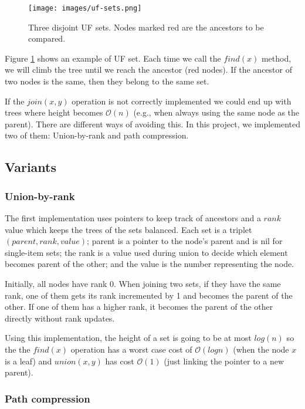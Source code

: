 \documentclass[a4paper,10pt,table,xcdraw]{article}
\begin{document}
\begin{figure}[H]
\centering
\texttt{[image: images/uf-sets.png]}
\caption{ Three disjoint UF sets. Nodes marked red are the ancestors to be compared.}
\label{fig:uf-set}
\end{figure}

Figure \ref{fig:uf-set} shows an example of UF set. Each time we call the $find(x)$ method, we will climb the tree until we reach the ancestor (red nodes). If the ancestor of two nodes is the same, then they belong to the same set. 

If the $join(x,y)$ operation is not correctly implemented we could end up with trees where height becomes $\mathcal{O} (n)$ (e.g., when always using the same node as the parent). There are different ways of avoiding this. In this project, we implemented two of them: Union-by-rank and path compression.


\subsection{Variants}

\subsubsection{Union-by-rank}

The first implementation uses pointers to keep track of ancestors and a $rank$ value which keeps the trees of the sets balanced. Each set is a triplet $(parent, rank, value)$; parent is a pointer to the node's parent and is nil for single-item sets; the rank is a value used during union to decide which element becomes parent of the other; and the value is the number representing the node. 

Initially, all nodes have rank 0. When joining two sets, if they have the same rank, one of them gets its rank incremented by 1 and becomes the parent of the other. If one of them has a higher rank, it becomes the parent of the other directly without rank updates.

Using this implementation, the height of a set is going to be at most $log(n)$ so the the $find(x)$ operation has a worst case cost of $\mathcal{O} (log n)$ (when the node $x$ is a leaf) and $union(x,y)$ has cost $\mathcal{O} (1)$ (just linking the pointer to a new parent).

\subsubsection{Path compression}
\end{document}
